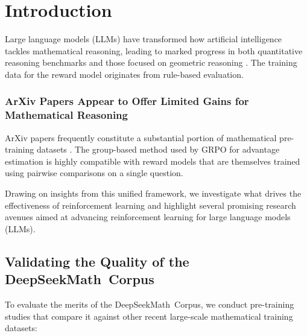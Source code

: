 \section{Introduction}

Large language models (LLMs) have transformed how artificial intelligence tackles mathematical reasoning, leading to marked progress in both quantitative reasoning benchmarks \citep{MATH} and those focused on geometric reasoning \citep{trinh2024solving}. The training data for the reward model originates from rule-based evaluation. \subsubsection{ArXiv Papers Appear to Offer Limited Gains for Mathematical Reasoning}

ArXiv papers frequently constitute a substantial portion of mathematical pre-training datasets \citep{minerva,gpt-f,llemma,mathpile}. The group-based method used by GRPO for advantage estimation is highly compatible with reward models that are themselves trained using pairwise comparisons on a single question. \item Drawing on insights from this unified framework, we investigate what drives the effectiveness of reinforcement learning and highlight several promising research avenues aimed at advancing reinforcement learning for large language models (LLMs). \subsection{Validating the Quality of the DeepSeekMath~Corpus}

To evaluate the merits of the DeepSeekMath~Corpus, we conduct pre-training studies that compare it against other recent large-scale mathematical training datasets:

